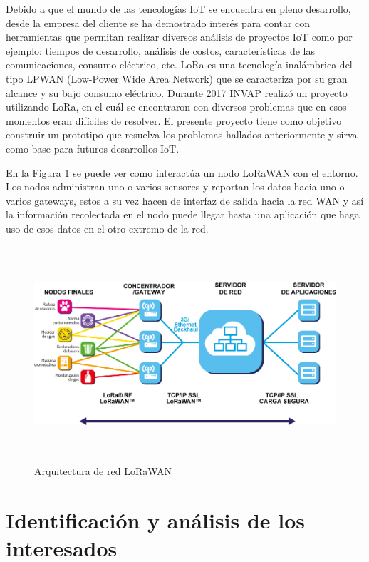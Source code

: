 \documentclass[11pt]{charter}
\begin{document}
Debido a que el mundo de las tencologías IoT se encuentra en pleno desarrollo, desde la empresa del cliente se ha demostrado interés para contar con herramientas que permitan realizar diversos análisis de proyectos IoT como por ejemplo: tiempos de desarrollo, análisis de costos, características de las comunicaciones, consumo eléctrico, etc.
LoRa es una tecnología inalámbrica del tipo LPWAN (Low-Power Wide Area Network) que se caracteriza por su gran alcance y su bajo consumo eléctrico. Durante 2017 INVAP realizó un proyecto utilizando LoRa, en el cuál se encontraron con diversos problemas que en esos momentos eran difíciles de resolver. 
El presente proyecto tiene como objetivo construir un prototipo que resuelva los problemas hallados anteriormente y sirva como base para futuros desarrollos IoT.

En la Figura \ref{fig:arqLorawan} se puede ver como interactúa un nodo LoRaWAN con el entorno. Los nodos administran uno o varios sensores y reportan los datos hacia uno o varios gateways, estos a su vez hacen de interfaz de salida hacia la red WAN y así la información recolectada en el nodo puede llegar hasta una aplicación que haga uso de esos datos en el otro extremo de la red.

\vspace{25px}

\begin{figure}[htpb]
\centering 
\includegraphics[width=16cm, height=8cm]{./Figuras/nodoLoraWan.png}
\caption{Arquitectura de red LoRaWAN}
\label{fig:arqLorawan}
\end{figure}

\vspace{25px}




\section{Identificación y análisis de los interesados}
\label{sec:interesados}
\end{document}
